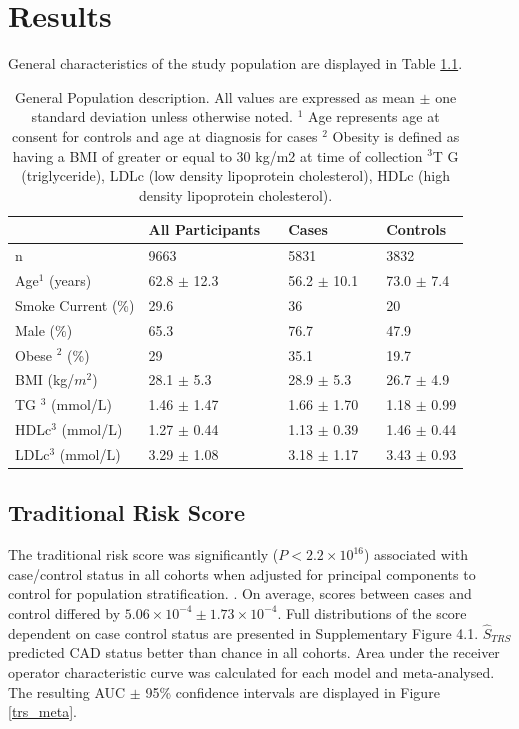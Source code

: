 \chapter{Results}
\let\cleardoublepage\clearpage 

General characteristics of the study population are displayed in Table \ref{pop}.
\tabularnewline
\tabularnewline

\begin{table}[bp]
\centering
\begin{tabular}{llllll}
\hline
                   & All Participants &  & Cases       &  & Controls    \\ \hline
n                  & 9663             &  & 5831        &  & 3832        \\
Age$^1$ (years)       & 62.8 $\pm$ 12.3      &  & 56.2 $\pm$ 10.1 &  & 73.0 $\pm$ 7.4  \\
Smoke Current (\%) & 29.6             &  & 36          &  & 20          \\
Male (\%)          & 65.3             &  & 76.7        &  & 47.9        \\
Obese $^2$ (\%)       & 29               &  & 35.1        &  & 19.7        \\
BMI (kg/$m^2$)        & 28.1 $\pm$ 5.3       &  & 28.9 $\pm$ 5.3  &  & 26.7 $\pm$ 4.9  \\
TG $^3$ (mmol/L)      & 1.46 $\pm$ 1.47      &  & 1.66 $\pm$ 1.70 &  & 1.18 $\pm$ 0.99 \\
HDLc$^3$ (mmol/L)     & 1.27 $\pm$ 0.44      &  & 1.13 $\pm$ 0.39 &  & 1.46 $\pm$ 0.44 \\
LDLc$^3$ (mmol/L)     & 3.29 $\pm$ 1.08      &  & 3.18 $\pm$ 1.17 &  & 3.43 $\pm$ 0.93 \\ \hline
\end{tabular}
\caption{General Population description. All values are expressed as mean $\pm$ one standard deviation unless otherwise noted. $^1$  Age represents age at consent for controls and age at diagnosis for cases
 $^2$ Obesity is defined as having a BMI of greater or equal to 30 kg/m2 at time of collection $^3$T G (triglyceride), LDLc (low density lipoprotein cholesterol), HDLc (high density lipoprotein cholesterol).}
\label{pop}
\end{table}


\section{Traditional Risk Score}

The traditional risk score was significantly ($P < 2.2 \times 10^{16}$) associated with case/control status in all cohorts when adjusted for principal components to control for population stratification. \citep{Price2006,Zhang2013}. On average, scores between cases and control differed by $5.06 \times 10^{-4} \pm 1.73 \times 10^{-4}$. Full distributions of the score dependent on case control status are presented in Supplementary Figure 4.1. $\hat{S}_{TRS}$ predicted CAD status better than chance in all cohorts. Area under the receiver operator characteristic curve was calculated for each model and meta-analysed. The resulting AUC $\pm$ 95\% confidence intervals are displayed in Figure \ref{trs_meta}.

